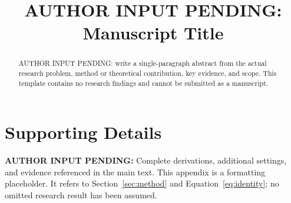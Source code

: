 \documentclass[anon,12pt]{colt2026}
\title[Manuscript Title]{AUTHOR INPUT PENDING: Manuscript Title}
\newcommand{\AuthorPending}[1]{\textbf{AUTHOR INPUT PENDING:} #1}
\begin{document}
\maketitle
\begin{abstract}
AUTHOR INPUT PENDING: write a single-paragraph abstract from the actual research problem,
method or theoretical contribution, key evidence, and scope. This template contains
no research findings and cannot be submitted as a manuscript.
\end{abstract}


\appendix
\section{Supporting Details}
\label{app:supporting}
\AuthorPending{Complete derivations, additional settings, and evidence referenced in the main text.}
This appendix is a formatting placeholder. It refers to Section~\ref{sec:method} and
Equation~\ref{eq:identity}; no omitted research result has been assumed.
\end{document}
